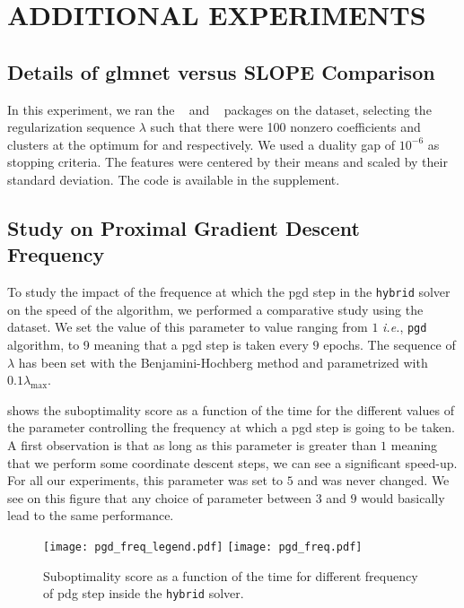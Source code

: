 \section{ADDITIONAL EXPERIMENTS}\label{sec:add_expes}

\subsection{Details of \textsf{glmnet} versus \textsf{SLOPE} Comparison}
\label{sec:slope-vs-glmnet}

In this experiment, we ran the ~\parencite{friedman2022} and ~\parencite{larsson2022d} packages on the  dataset, selecting the regularization sequence \(\lambda\) such that there were 100 nonzero coefficients and clusters at the optimum for  and  respectively.
We used a duality gap of \(10^{-6}\) as stopping criteria.
The features were centered by their means and scaled by their standard deviation.
The code is available in the supplement.

\subsection{Study on Proximal Gradient Descent Frequency}
To study the impact of the frequence at which the pgd step in the \texttt{hybrid} solver on the speed of the algorithm, we performed a comparative study using the  dataset. 
We set the value of this parameter to value ranging from $1$ \textit{i.e.}, \texttt{pgd} algorithm, to 9 meaning that a pgd step is taken every $9$ epochs. 
The sequence of $\lambda$ has been set with the Benjamini-Hochberg method and parametrized with $0.1 \lambda_{\text{max}}$. 

 shows the suboptimality score as a function of the time for the different values of the parameter controlling the frequency at which a pgd step is going to be taken. 
A first observation is that as long as this parameter is greater than $1$ meaning that we perform some coordinate descent steps, we can see a significant speed-up. 
For all our experiments, this parameter was set to $5$ and was never changed. 
We see on this figure that any choice of parameter between $3$ and $9$ would basically lead to the same performance. 

\begin{figure*}[htb]
  \centering
  \texttt{[image: pgd\_freq\_legend.pdf]}
  \texttt{[image: pgd\_freq.pdf]}
  \caption{Suboptimality score as a function of the time for different frequency of pdg step inside the \texttt{hybrid} solver.}
  \label{fig:pgd_freq}
\end{figure*}
